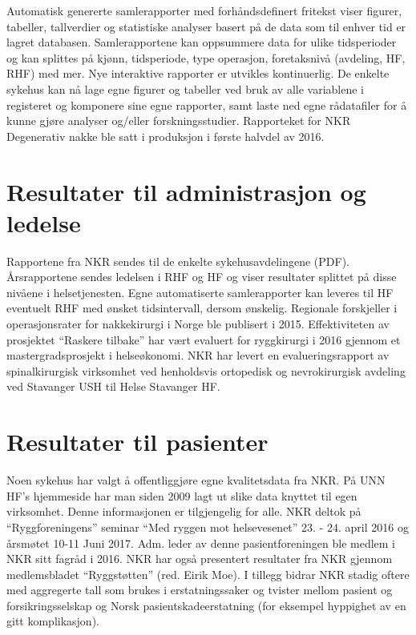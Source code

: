 \documentclass[norsk, a4paper, twocolumn]{report}
\begin{document}
Automatisk genererte samlerapporter med forhåndsdefinert fritekst viser figurer, tabeller, tallverdier og statistiske analyser basert på de data som til enhver tid er lagret databasen. Samlerapportene kan oppsummere data for ulike tidsperioder og kan splittes på kjønn, tidsperiode, type operasjon, foretaksnivå (avdeling, HF, RHF) med mer. Nye interaktive rapporter er utvikles kontinuerlig. De enkelte sykehus kan nå lage egne figurer og tabeller ved bruk av alle variablene i registeret og komponere sine egne rapporter, samt laste ned egne rådatafiler for å kunne gjøre analyser og/eller forskningsstudier. Rapporteket for NKR Degenerativ nakke ble satt i produksjon i første halvdel av 2016.


\section{Resultater til administrasjon og ledelse}\label{sec:resled}


Rapportene fra NKR sendes til de enkelte sykehusavdelingene (PDF). Årsrapportene sendes ledelsen i RHF og HF og viser resultater splittet på disse nivåene i helsetjenesten. Egne automatiserte samlerapporter kan leveres til HF eventuelt RHF med ønsket tidsintervall, dersom  ønskelig. Regionale forskjeller i operasjonsrater for nakkekirurgi i Norge ble publisert i 2015. Effektiviteten av prosjektet ``Raskere tilbake'' har vært evaluert for ryggkirurgi i 2016 gjennom et mastergradsprosjekt i helseøkonomi. NKR har levert en evalueringsrapport av spinalkirurgisk virksomhet ved henholdsvis ortopedisk og nevrokirurgisk avdeling ved Stavanger USH til Helse Stavanger HF. 

\section{Resultater til pasienter}\label{sec:respas}
Noen sykehus har valgt å offentliggjøre egne kvalitetsdata fra NKR. På UNN HF’s hjemmeside har man siden 2009 lagt ut slike data knyttet til egen virksomhet. Denne informasjonen er tilgjengelig for alle. NKR deltok på ``Ryggforeningens'' seminar ``Med ryggen mot helsevesenet'' 23. - 24. april 2016 og årsmøtet 10-11 Juni 2017. Adm. leder av denne pasientforeningen ble medlem i NKR sitt fagråd i 2016. NKR har også  presentert resultater fra NKR gjennom medlemsbladet ``Ryggstøtten'' (red. Eirik Moe). I tillegg bidrar NKR stadig oftere med aggregerte tall som brukes i erstatningssaker og tvister mellom pasient og forsikringsselskap og Norsk pasientskadeerstatning (for eksempel hyppighet av en gitt komplikasjon).
\end{document}
